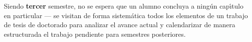 \documentclass[10 pt]{article}
\begin{document}


Siendo {\bf tercer} semestre, no se espera que un alumno concluya a
ning\'{u}n cap\'{\i}tulo en particular --- se visitan de forma
sistem\'{a}tica todos los elementos de un trabajo de tesis de
doctorado para analizar el avance actual y calendarizar de manera
estructurada el trabajo pendiente para semestres posteriores.


\end{document}
